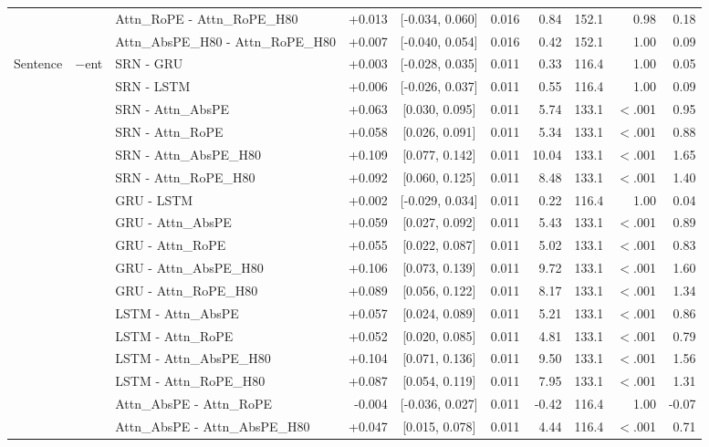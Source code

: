 \begin{longtable}{@{}lllrcrrrrr@{}}
 &  & Attn\_RoPE - Attn\_RoPE\_H80 & +0.013 & [-0.034, 0.060] & 0.016 & 0.84 & 152.1 & 0.98 & 0.18 \\
 &  & Attn\_AbsPE\_H80 - Attn\_RoPE\_H80 & +0.007 & [-0.040, 0.054] & 0.016 & 0.42 & 152.1 & 1.00 & 0.09 \\
\addlinespace[2pt]
\addlinespace
Sentence & $-$ent & SRN - GRU & +0.003 & [-0.028, 0.035] & 0.011 & 0.33 & 116.4 & 1.00 & 0.05 \\
 &  & SRN - LSTM & +0.006 & [-0.026, 0.037] & 0.011 & 0.55 & 116.4 & 1.00 & 0.09 \\
 &  & SRN - Attn\_AbsPE & +0.063 & [0.030, 0.095] & 0.011 & 5.74 & 133.1 & $<$.001 & 0.95 \\
 &  & SRN - Attn\_RoPE & +0.058 & [0.026, 0.091] & 0.011 & 5.34 & 133.1 & $<$.001 & 0.88 \\
 &  & SRN - Attn\_AbsPE\_H80 & +0.109 & [0.077, 0.142] & 0.011 & 10.04 & 133.1 & $<$.001 & 1.65 \\
 &  & SRN - Attn\_RoPE\_H80 & +0.092 & [0.060, 0.125] & 0.011 & 8.48 & 133.1 & $<$.001 & 1.40 \\
 &  & GRU - LSTM & +0.002 & [-0.029, 0.034] & 0.011 & 0.22 & 116.4 & 1.00 & 0.04 \\
 &  & GRU - Attn\_AbsPE & +0.059 & [0.027, 0.092] & 0.011 & 5.43 & 133.1 & $<$.001 & 0.89 \\
 &  & GRU - Attn\_RoPE & +0.055 & [0.022, 0.087] & 0.011 & 5.02 & 133.1 & $<$.001 & 0.83 \\
 &  & GRU - Attn\_AbsPE\_H80 & +0.106 & [0.073, 0.139] & 0.011 & 9.72 & 133.1 & $<$.001 & 1.60 \\
 &  & GRU - Attn\_RoPE\_H80 & +0.089 & [0.056, 0.122] & 0.011 & 8.17 & 133.1 & $<$.001 & 1.34 \\
 &  & LSTM - Attn\_AbsPE & +0.057 & [0.024, 0.089] & 0.011 & 5.21 & 133.1 & $<$.001 & 0.86 \\
 &  & LSTM - Attn\_RoPE & +0.052 & [0.020, 0.085] & 0.011 & 4.81 & 133.1 & $<$.001 & 0.79 \\
 &  & LSTM - Attn\_AbsPE\_H80 & +0.104 & [0.071, 0.136] & 0.011 & 9.50 & 133.1 & $<$.001 & 1.56 \\
 &  & LSTM - Attn\_RoPE\_H80 & +0.087 & [0.054, 0.119] & 0.011 & 7.95 & 133.1 & $<$.001 & 1.31 \\
 &  & Attn\_AbsPE - Attn\_RoPE & -0.004 & [-0.036, 0.027] & 0.011 & -0.42 & 116.4 & 1.00 & -0.07 \\
 &  & Attn\_AbsPE - Attn\_AbsPE\_H80 & +0.047 & [0.015, 0.078] & 0.011 & 4.44 & 116.4 & $<$.001 & 0.71 \\

\end{longtable}
